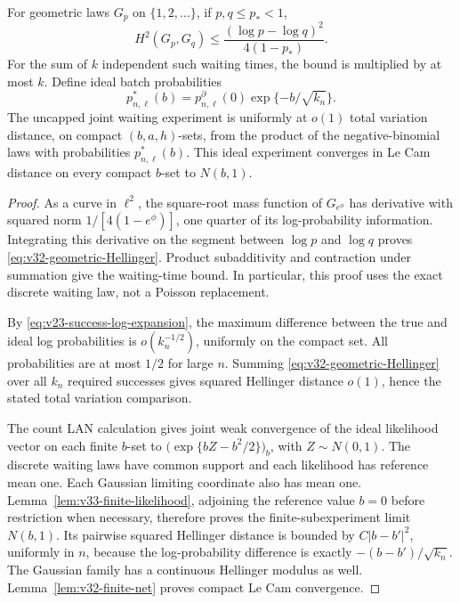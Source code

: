 \begin{lemma}
\label{lem:v32-waiting-Hellinger}
For geometric laws \(G_p\) on \(\{1,2,\ldots\}\), if \(p,q\le p_*<1\),
\begin{equation}\label{eq:v32-geometric-Hellinger}
 H^2(G_p,G_q)\le \frac{(\log p-\log q)^2}{4(1-p_*)}.
\end{equation}
For the sum of \(k\) independent such waiting times, the bound is multiplied
by at most \(k\).  Define ideal batch probabilities
\[
 p^*_{n,\ell}(b)=p^\partial_{n,\ell}(0)\exp\{-b/\sqrt{k_n}\}.
\]
The uncapped joint waiting experiment is uniformly at \(o(1)\) total
variation distance, on compact \((b,a,h)\)-sets, from the product of the
negative-binomial laws with probabilities \(p^*_{n,\ell}(b)\).
This ideal experiment converges in Le Cam distance on every compact
\(b\)-set to \(N(b,1)\).
\end{lemma}

\begin{proof}
As a curve in \(\ell^2\), the square-root mass function of \(G_{e^\phi}\)
has derivative with squared norm \(1/[4(1-e^\phi)]\), one quarter of its
log-probability information.  Integrating this derivative on the segment
between \(\log p\) and \(\log q\) proves
\eqref{eq:v32-geometric-Hellinger}.  Product subadditivity and contraction
under summation give the waiting-time bound.  In particular, this proof uses
the exact discrete waiting law, not a Poisson replacement.

By \eqref{eq:v23-success-log-expansion}, the maximum difference between the
true and ideal log probabilities is \(o(k_n^{-1/2})\), uniformly on the
compact set.  All probabilities are at most \(1/2\) for large \(n\).
Summing \eqref{eq:v32-geometric-Hellinger} over all \(k_n\) required
successes gives squared Hellinger distance \(o(1)\), hence the stated total
variation comparison.

The count LAN calculation gives joint weak convergence of the ideal
likelihood vector on each finite \(b\)-set to
\(\bigl(\exp\{bZ-b^2/2\}\bigr)_b\), with \(Z\sim N(0,1)\).
The discrete waiting laws have common support and each likelihood has
reference mean one.  Each Gaussian limiting coordinate also has mean one.
Lemma~\ref{lem:v33-finite-likelihood}, adjoining the reference value
\(b=0\) before restriction when necessary, therefore proves the
finite-subexperiment limit \(N(b,1)\).  Its pairwise squared Hellinger distance is bounded by
\(C|b-b'|^2\), uniformly in \(n\), because the log-probability difference
is exactly \(-(b-b')/\sqrt{k_n}\).  The Gaussian family has a continuous
Hellinger modulus as well.  Lemma~\ref{lem:v32-finite-net} proves compact
Le Cam convergence.
\end{proof}

